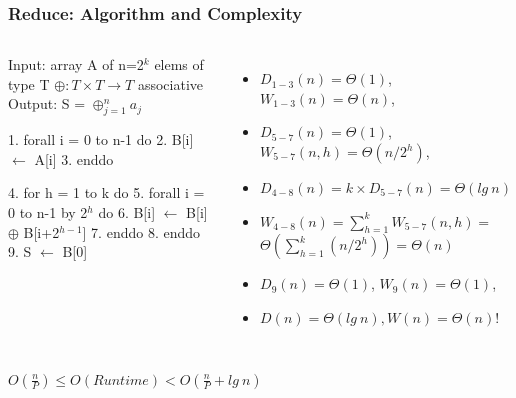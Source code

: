 \documentclass{beamer}
\renewcommand{\emph}[1]{\textcolor{structure}{#1}}
\newcommand{\emp}[1]{\textcolor{DikuRed}{ #1}}
\newcommand{\mymath}[1]{$ #1 $}
\newcommand{\myindx}[1]{_{#1}}
\newcommand{\myindu}[1]{^{#1}}
\begin{document}
\begin{frame}[fragile,t]
  \frametitle{Reduce: Algorithm and Complexity}


\begin{columns}
\begin{colorcode}[fontsize=\scriptsize]
Input:  array A of n=2\mymath{\myindu{k}} elems of type T
        \mymath{\oplus : T\times T\rightarrow T} associative
Output: S = \mymath{\oplus\myindx{j=1}\myindu{n} a\myindx{j}}

1.  \emph{forall i = 0 to n-1 do}
2.    B[i] \mymath{\leftarrow} A[i]
3.  \emph{enddo}

4.  \emp{for h = 1 to k do}
5.    \emph{forall i = 0 to n-1 by 2\mymath{\myindu{h}} do} 
6.      B[i] \mymath{\leftarrow} B[i] \mymath{\oplus} B[i+2\mymath{\myindu{h-1}}]
7.    \emph{enddo}
8.  \emp{enddo}
9.  S \mymath{\leftarrow} B[0]  
\end{colorcode}
\begin{itemize}
    \item $D_{1-3}(n) = \Theta(1)$, $W_{1-3}(n) = \Theta(n)$,
    \item $D_{5-7}(n) = \Theta(1)$, $W_{5-7}(n,h) = \Theta(n/2^h)$,
    \item $D_{4-8}(n) = k \times D_{5-7}(n) = \Theta(lg \ n)$
    \item $W_{4-8}(n) = \sum_{h=1}^k W_{5-7}(n,h) = $\\
          $\Theta(\sum_{h=1}^k (n/2^h) ) = \Theta(n)$
    \item $D_{9}(n) = \Theta(1)$, $W_{9}(n) = \Theta(1)$,\bigskip
    \item \emp{$D(n) = \Theta(lg \ n), W(n) = \Theta(n)$!}
\end{itemize}
\end{columns}
\bigskip


\begin{center}  
\emp{$O(\frac{n}{P}) \leq  O(Runtime) < O(\frac{n}{P} + lg \ n)$}
\end{center}


\end{frame}
\end{document}

